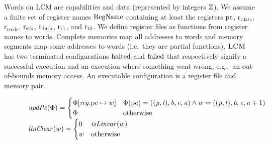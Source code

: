 \documentclass[acmsmall,screen]{acmart}\settopmatter{}
\renewcommand{\RegName}{\shareddom{RegName}}
\renewcommand{\decInstr}[1]{\plainfun{decode}{#1}}
\renewcommand{\updPcAddr}[1]{\plainfun{updPc}{#1}}
\renewcommand{\linCons}[1]{\plainfun{linClear}{#1}}
\renewcommand{\perm}{\var{p}}
\renewcommand{\rretc}{\mathrm{r}_{\mathrm{rcode}}}
\renewcommand{\rretd}{\mathrm{r}_{\mathrm{rdata}}}
\newcommand{\trgcm}{\textsc{LCM}}
\begin{document}
Words on \trgcm{} are capabilities and data (represented by integers $\mathbb{Z}$).
We assume a finite set of register names $\RegName$ containing at least the registers $\mathrm{pc}$, $\rretd$, $\rretc$, $\mathrm{r}_\mathrm{stk}$, $\mathrm{r}_\mathrm{data}$, $\mathrm{r}_\mathrm{t1}$, and $\mathrm{r}_\mathrm{t2}$.
We define register files as functions from register names to words.
Complete memories map all addresses to words and memory segments map some addresses to words (i.e.\ they are partial functions).
$\trgcm{}$ has two terminated configurations $\mathrm{halted}$ and $\mathrm{failed}$ that respectively signify a successful execution and an execution where something went wrong, e.g.,\ an out-of-bounds memory access.
An executable configuration is a register file and memory pair.

\begin{figure}[p]
  \centering
  \[
    \begin{array}{l}
  \updPcAddr{\Phi} =
  \begin{cases}
    \Phi\updReg{\pcreg}{w} & \Phi(\pcreg) = ((\perm,\lin),\baddr,\eaddr,\aaddr) \wedge w = ((\perm,\lin),\baddr,\eaddr,\aaddr+1)\\
    \Phi  & \totherwise
  \end{cases}\\
  \linCons{w} =
  \begin{cases}
    0 & \isLinear{w} \\
    w & \totherwise
  \end{cases}\\

\end{array}\]
\end{figure}
\end{document}
